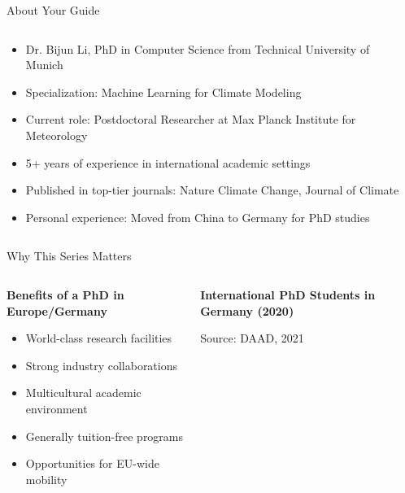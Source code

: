 \documentclass[aspectratio=169,10pt]{beamer}
\begin{document}
\begin{frame}{About Your Guide}
\begin{columns}[T]
    \begin{column}{0.7\textwidth}
        \begin{itemize}
            \item Dr. Bijun Li, PhD in Computer Science from Technical University of Munich
            \item Specialization: Machine Learning for Climate Modeling
            \item Current role: Postdoctoral Researcher at Max Planck Institute for Meteorology
            \item 5+ years of experience in international academic settings
            \item Published in top-tier journals: Nature Climate Change, Journal of Climate
            \item Personal experience: Moved from China to Germany for PhD studies
        \end{itemize}
    \end{column}
    \begin{column}{0.3\textwidth}
    \end{column}
\end{columns}
\end{frame}

\begin{frame}{Why This Series Matters}
\begin{columns}[T]
    \begin{column}{0.6\textwidth}
        \textbf{Benefits of a PhD in Europe/Germany}
        \begin{itemize}
            \item World-class research facilities
            \item Strong industry collaborations
            \item Multicultural academic environment
            \item Generally tuition-free programs
            \item Opportunities for EU-wide mobility
        \end{itemize}
    \end{column}
    \begin{column}{0.4\textwidth}
        \textbf{International PhD Students in Germany (2020)}
        \tiny{Source: DAAD, 2021}
    \end{column}
\end{columns}
\end{frame}
\end{document}
